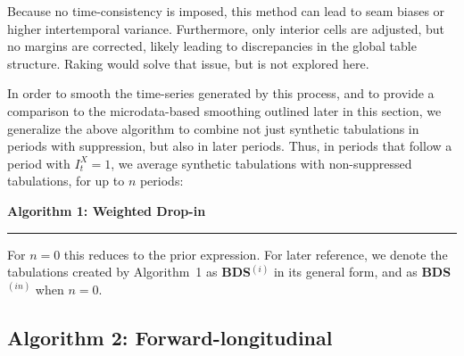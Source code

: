 Because no time-consistency is imposed, this method can lead to seam biases or higher 
intertemporal variance. Furthermore, only interior cells are adjusted, but no margins are 
corrected, likely leading to discrepancies in the global table structure. Raking would solve that 
issue, but is not explored here. %

In order to smooth the time-series generated by this process, and to provide a comparison to 
the microdata-based smoothing outlined later in this section, we generalize the above algorithm 
to combine not just synthetic tabulations in periods with suppression, but also in later periods. 
Thus, in periods that follow a period with $I_{t}^X = 1$, we average synthetic tabulations with 
non-suppressed tabulations, for up to $n$ periods:
\begin{algorithm}
{\bf Algorithm 1: Weighted Drop-in}
\hrule
\label{alg1}
\begin{algorithmic}
\Else
\EndIf
\end{algorithmic}
\end{algorithm}

For $n=0$ this reduces to the prior expression. 
For later 
reference, we denote the tabulations created by Algorithm~1 as \textbf{BDS$^{(i)}$} 
in its general form, and as \textbf{BDS$^{(in)}$}  when $n=0$.

\subsection{Algorithm 2: Forward-longitudinal}

